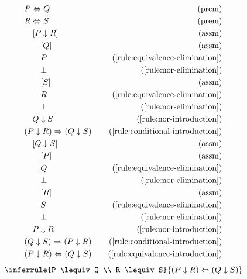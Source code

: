 \begin{align*}
    \premise{P \lequiv Q}\\
    \premise{R \lequiv S}\\
    \assumption[1]{P \nor R}\\
    \assumption[2]{Q}\\
    \byrule[2]{P}{\ref{rule:equivalence-elimination}}\\
    \byrule[2]{\bot}{\ref{rule:nor-elimination}}\\
    \assumption[2]{S}\\
    \byrule[2]{R}{\ref{rule:equivalence-elimination}}\\
    \byrule[2]{\bot}{\ref{rule:nor-elimination}}\\
    \byrule[1]{Q \nor S}{\ref{rule:nor-introduction}}\\
    \byrule{(P \nor R) \implies (Q \nor S)}{\ref{rule:conditional-introduction}}\\
    \assumption[1]{Q \nor S}\\
    \assumption[2]{P}\\
    \byrule[2]{Q}{\ref{rule:equivalence-elimination}}\\
    \byrule[2]{\bot}{\ref{rule:nor-elimination}}\\
    \assumption[2]{R}\\
    \byrule[2]{S}{\ref{rule:equivalence-elimination}}\\
    \byrule[2]{\bot}{\ref{rule:nor-elimination}}\\
    \byrule[1]{P \nor R}{\ref{rule:nor-introduction}}\\
    \byrule{(Q \nor S) \implies (P \nor R)}{\ref{rule:conditional-introduction}}\\
    \byrule{(P \nor R) \lequiv (Q \nor S)}{\ref{rule:equivalence-introduction}}
\end{align*}
\begin{equation}
    \inferrule{P \lequiv Q \\ R \lequiv S}{(P \nor R) \lequiv (Q \nor S)}
    \label{rule:nor-congruence}
\end{equation}

